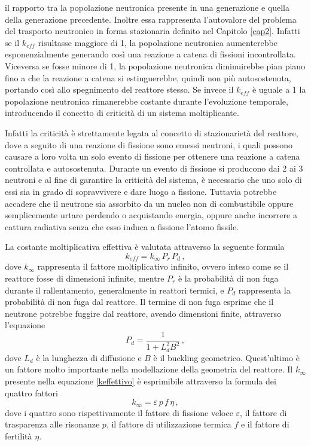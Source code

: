 il rapporto tra la popolazione neutronica presente in una generazione e quella 
della generazione precedente. Inoltre essa rappresenta l'autovalore del 
problema 
del trasporto neutronico in forma stazionaria definito nel Capitolo \ref{cap2}.
Infatti se il $k_{eff}$ risultasse maggiore di 1, la popolazione neutronica 
aumenterebbe esponenzialmente generando così una reazione a catena di fissioni 
incontrollata. Viceversa se fosse minore di 1, la popolazione neutronica 
diminuirebbe pian piano fino a che la reazione a catena si estinguerebbe, 
quindi 
non più autosostenuta, portando così allo spegnimento del reattore stesso. 
Se invece il $k_{eff}$ è uguale a 1 la popolazione neutronica rimanerebbe costante durante l'evoluzione temporale, introducendo il concetto di criticità di un sistema moltiplicante.

Infatti la criticità è strettamente legata al concetto di stazionarietà del 
reattore, 
dove a seguito di una reazione di fissione sono emessi neutroni, i quali possono
causare a loro volta un solo evento di fissione per ottenere una reazione a 
catena controllata e autosostenuta.
Durante un evento di fissione si producono dai 2 ai 3 neutroni e al fine 
di garantire la criticità del sistema, è necessario che uno solo di essi sia in 
grado di sopravvivere e dare luogo a fissione.
Tuttavia potrebbe accadere che il neutrone sia assorbito da un nucleo non di 
combustibile 
oppure semplicemente urtare perdendo o acquistando energia, oppure anche 
incorrere a cattura radiativa senza che esso induca a fissione l'atomo fissile.

La costante moltiplicativa effettiva è valutata attraverso la seguente formula
\begin{equation}
\label{keffettivo}
k_{eff}= k_\infty \, P_r \, P_d \,,
\end{equation}
dove $k_\infty$ rappresenta il fattore moltiplicativo infinito, ovvero inteso come se 
il reattore fosse di dimensioni infinite, mentre $P_r$ è la probabilità di non 
fuga durante il rallentamento, generalmente in reattori termici, e $P_d$ 
rappresenta la probabilità di non fuga dal reattore. 
Il termine di non fuga esprime che il neutrone potrebbe fuggire dal reattore,
avendo dimensioni finite, attraverso l'equazione
\begin{equation}
P_d=\frac{1}{1+L_d^2B^2} \,,
\end{equation}
dove $L_d$ è la lunghezza di diffusione e $B$ è il buckling geometrico. 
Quest'ultimo è un fattore molto importante nella modellazione della geometria 
del reattore.
Il $k_\infty$ presente nella equazione \eqref{keffettivo} è esprimibile 
attraverso la formula dei quattro fattori
\begin{equation}
k_\infty = \varepsilon \, p \, f \, \eta \,,
\end{equation}
dove i quattro sono rispettivamente il fattore di fissione veloce 
$\varepsilon$, 
il fattore di trasparenza alle risonanze $p$, il fattore di utilizzazione 
termica $f$ e il fattore di fertilità $\eta$.

